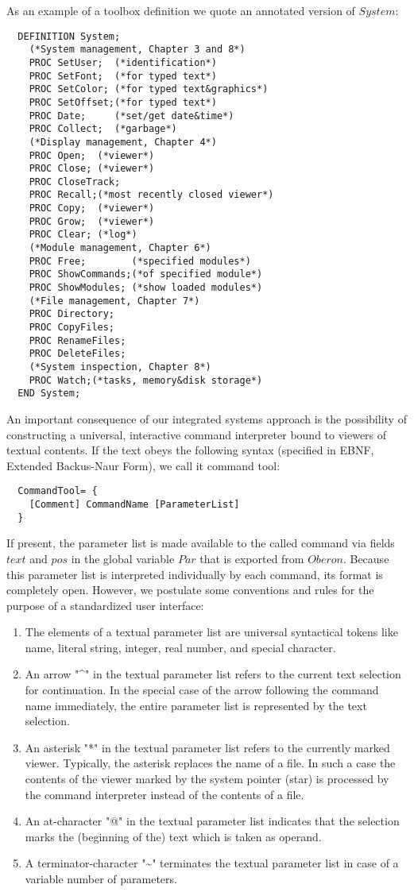 As an example of a toolbox definition we quote an annotated version of $System$:
\begin{verbatim}
  DEFINITION System;
    (*System management, Chapter 3 and 8*)
    PROC SetUser;  (*identification*)
    PROC SetFont;  (*for typed text*)
    PROC SetColor; (*for typed text&graphics*)
    PROC SetOffset;(*for typed text*)
    PROC Date;     (*set/get date&time*)
    PROC Collect;  (*garbage*)
    (*Display management, Chapter 4*)
    PROC Open;  (*viewer*)
    PROC Close; (*viewer*)
    PROC CloseTrack;
    PROC Recall;(*most recently closed viewer*)
    PROC Copy;  (*viewer*)
    PROC Grow;  (*viewer*)
    PROC Clear; (*log*)
    (*Module management, Chapter 6*)
    PROC Free;        (*specified modules*)
    PROC ShowCommands;(*of specified module*)
    PROC ShowModules; (*show loaded modules*)
    (*File management, Chapter 7*)
    PROC Directory;
    PROC CopyFiles;
    PROC RenameFiles;
    PROC DeleteFiles;
    (*System inspection, Chapter 8*)
    PROC Watch;(*tasks, memory&disk storage*)
  END System;
\end{verbatim}
An important consequence of our integrated systems approach is the possibility of constructing a
universal, interactive command interpreter bound to viewers of textual contents. If the text obeys
the following syntax (specified in EBNF, Extended Backus-Naur Form), we call it command tool:
\begin{verbatim}
  CommandTool= {
    [Comment] CommandName [ParameterList]
  }
\end{verbatim}
If present, the parameter list is made available to the called command via fields $text$ and $pos$ in
the global variable $Par$ that is exported from $Oberon$. Because this parameter list is
interpreted individually by each command, its format is completely open. However, we postulate
some conventions and rules for the purpose of a standardized user interface:

\begin{enumerate}
	\item The elements of a textual parameter list are universal syntactical tokens like name, literal
string, integer, real number, and special character.
	\item An arrow "\^{}" in the textual parameter list refers to the current text selection for continuation. In
the special case of the arrow following the command name immediately, the entire parameter list
is represented by the text selection.
	\item An asterisk "*" in the textual parameter list refers to the currently marked viewer. Typically, the
asterisk replaces the name of a file. In such a case the contents of the viewer marked by the
system pointer (star) is processed by the command interpreter instead of the contents of a file.
	\item An at-character "@" in the textual parameter list indicates that the selection marks the
(beginning of the) text which is taken as operand.
	\item A terminator-character "\~{}" terminates the textual parameter list in case of a variable number of
parameters.
\end{enumerate}

